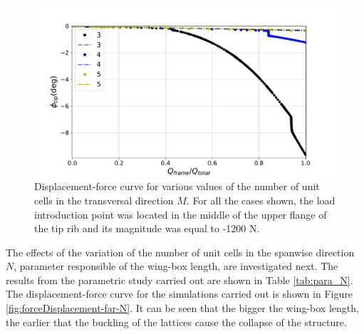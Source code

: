     \begin{figure}[!htpb] %
      \centering
      \includegraphics[width=0.8 \textwidth]{figures/result-sim/M/force_displacement-far-1200N}
      \caption[Displacement-force curve for various values of the number of unit cells in the transversal direction]{Displacement-force curve for various values of the number of unit cells in the transversal direction $M$. For all the cases shown, the load introduction point was located in the middle of the upper flange of the tip rib and its magnitude was equal to -1200 N.}\label{fig:forceDisplacement-far-M}
    \end{figure}

    \clearpage
    The effects of the variation of the number of unit cells in the spanwise direction $N$, parameter responsible of the wing-box length, are investigated next. The results from the parametric study carried out are shown in Table \ref{tab:para_N}. The displacement-force curve for the simulations carried out is shown in Figure \ref{fig:forceDisplacement-far-N}. It can be seen that the bigger the wing-box length, the earlier that the buckling of the lattices cause the collapse of the structure.


